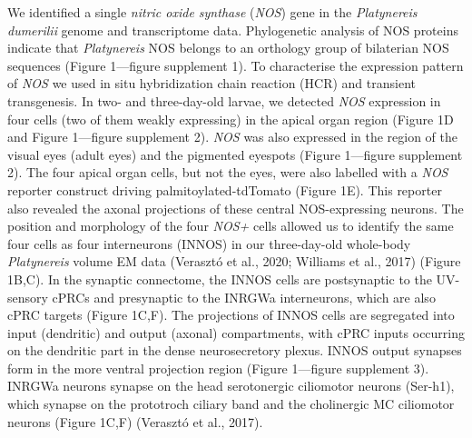 \documentclass[
  10pt,
  onecolumn]{article}
\begin{document}
We identified a single \emph{nitric oxide synthase} (\emph{NOS}) gene in
the \emph{Platynereis dumerilii} genome and transcriptome data.
Phylogenetic analysis of NOS proteins indicate that \emph{Platynereis}
NOS belongs to an orthology group of bilaterian NOS sequences (Figure
1---figure supplement 1). To characterise the expression pattern of
\emph{NOS} we used in situ hybridization chain reaction (HCR) and
transient transgenesis. In two- and three-day-old larvae, we detected
\emph{NOS} expression in four cells (two of them weakly expressing) in
the apical organ region (Figure 1D and Figure 1---figure supplement 2).
\emph{NOS} was also expressed in the region of the visual eyes (adult
eyes) and the pigmented eyespots (Figure 1---figure supplement 2). The
four apical organ cells, but not the eyes, were also labelled with a
\emph{NOS} reporter construct driving palmitoylated-tdTomato (Figure
1E). This reporter also revealed the axonal projections of these central
NOS-expressing neurons. The position and morphology of the four
\emph{NOS+} cells allowed us to identify the same four cells as four
interneurons (INNOS) in our three-day-old whole-body \emph{Platynereis}
volume EM data (Verasztó et al., 2020; Williams et al., 2017) (Figure
1B,C). In the synaptic connectome, the INNOS cells are postsynaptic to
the UV-sensory cPRCs and presynaptic to the INRGWa interneurons, which
are also cPRC targets (Figure 1C,F). The projections of INNOS cells are
segregated into input (dendritic) and output (axonal) compartments, with
cPRC inputs occurring on the dendritic part in the dense neurosecretory
plexus. INNOS output synapses form in the more ventral projection region
(Figure 1---figure supplement 3). INRGWa neurons synapse on the head
serotonergic ciliomotor neurons (Ser-h1), which synapse on the
prototroch ciliary band and the cholinergic MC ciliomotor neurons
(Figure 1C,F) (Verasztó et al., 2017).
\end{document}

